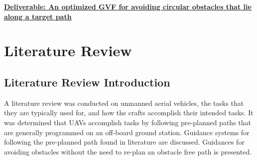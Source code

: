 \documentclass[numbered,pdftex]{ohio-etd}
\begin{document}
 \noindent
 \textbf{\underline{Deliverable: An optimized GVF for avoiding circular obstacles that lie along a target path}}
 
 
 
\chapter{Literature Review}
\section{Literature Review Introduction}

A literature review was conducted on unmanned aerial vehicles, the tasks that they are typically used for, and how the crafts accomplish their intended tasks. It was determined that UAVs accomplish tasks by following pre-planned paths that are generally programmed on an off-board ground station. Guidance systems for following the pre-planned path found in literature are discussed. Guidances for avoiding obstacles without the need to re-plan an obstacle free path is presented.
\end{document}
